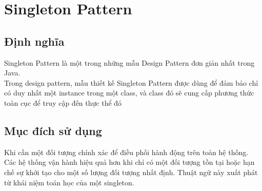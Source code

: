\chapter{Singleton Pattern}

\section{Định nghĩa}
Singleton Pattern là một trong những mẫu Design Pattern đơn giản nhất trong Java.\\
Trong design pattern, mẫu thiết kế Singleton Pattern được dùng để đảm bảo chỉ có duy nhất một instance trong một class, và class đó sẽ cung cấp phương thức toàn cục để truy cập đến thực thể đó

\section{Mục đích sử dụng}
Khi cần một đối tượng chính xác để điều phối hành động trên toàn hệ thống. Các hệ thống vận hành hiệu quả hơn khi chỉ có một đối tượng tồn tại hoặc hạn chế sự khởi tạo cho một số lượng đối tượng nhất định. Thuật ngữ này xuất phát từ khái niệm toán học của một singleton.

